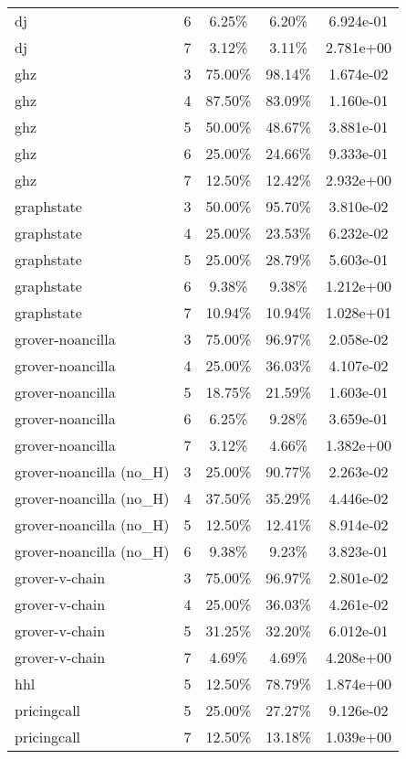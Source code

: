 \begin{table}[ht!]
\begin{tabular}{lc||ccc}
dj & 6 & 6.25\% & 6.20\% & 6.924e-01 \\
dj & 7 & 3.12\% & 3.11\% & 2.781e+00 \\
\midrule
ghz & 3 & 75.00\% & 98.14\% & 1.674e-02 \\
ghz & 4 & 87.50\% & 83.09\% & 1.160e-01 \\
ghz & 5 & 50.00\% & 48.67\% & 3.881e-01 \\
ghz & 6 & 25.00\% & 24.66\% & 9.333e-01 \\
ghz & 7 & 12.50\% & 12.42\% & 2.932e+00 \\
\midrule
graphstate & 3 & 50.00\% & 95.70\% & 3.810e-02 \\
graphstate & 4 & 25.00\% & 23.53\% & 6.232e-02 \\
graphstate & 5 & 25.00\% & 28.79\% & 5.603e-01 \\
graphstate & 6 & 9.38\% & 9.38\% & 1.212e+00 \\
graphstate & 7 & 10.94\% & 10.94\% & 1.028e+01 \\
\midrule
grover-noancilla & 3 & 75.00\% & 96.97\% & 2.058e-02 \\
grover-noancilla & 4 & 25.00\% & 36.03\% & 4.107e-02 \\
grover-noancilla & 5 & 18.75\% & 21.59\% & 1.603e-01 \\
grover-noancilla & 6 & 6.25\% & 9.28\% & 3.659e-01 \\
grover-noancilla & 7 & 3.12\% & 4.66\% & 1.382e+00 \\
\midrule
grover-noancilla (no\_H) & 3 & 25.00\% & 90.77\% & 2.263e-02 \\
grover-noancilla (no\_H) & 4 & 37.50\% & 35.29\% & 4.446e-02 \\
grover-noancilla (no\_H) & 5 & 12.50\% & 12.41\% & 8.914e-02 \\
grover-noancilla (no\_H) & 6 & 9.38\% & 9.23\% & 3.823e-01 \\
\midrule
grover-v-chain & 3 & 75.00\% & 96.97\% & 2.801e-02 \\
grover-v-chain & 4 & 25.00\% & 36.03\% & 4.261e-02 \\
grover-v-chain & 5 & 31.25\% & 32.20\% & 6.012e-01 \\
grover-v-chain & 7 & 4.69\% & 4.69\% & 4.208e+00 \\
\midrule
hhl & 5 & 12.50\% & 78.79\% & 1.874e+00 \\
\midrule
pricingcall & 5 & 25.00\% & 27.27\% & 9.126e-02 \\
pricingcall & 7 & 12.50\% & 13.18\% & 1.039e+00 \\

\end{tabular}
\end{table}
